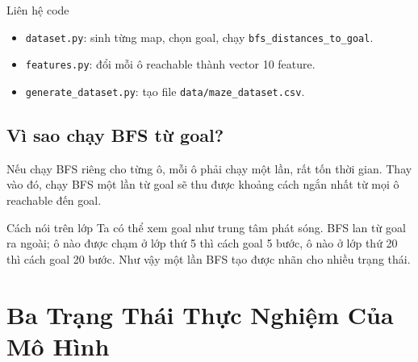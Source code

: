 \documentclass[12pt,a4paper]{article}
\newcommand{\code}[1]{\texttt{#1}}
\begin{document}
\begin{center}
\end{center}

\begin{teachbox}{Liên hệ code}
\begin{itemize}
    \item \code{dataset.py}: sinh từng map, chọn goal, chạy \code{bfs\_distances\_to\_goal}.
    \item \code{features.py}: đổi mỗi ô reachable thành vector 10 feature.
    \item \code{generate\_dataset.py}: tạo file \code{data/maze\_dataset.csv}.
\end{itemize}
\end{teachbox}

\subsection{Vì sao chạy BFS từ goal?}

Nếu chạy BFS riêng cho từng ô, mỗi ô phải chạy một lần, rất tốn thời gian. Thay vào đó, chạy BFS một lần từ goal sẽ thu được khoảng cách ngắn nhất từ mọi ô reachable đến goal.

\begin{saybox}{Cách nói trên lớp}
Ta có thể xem goal như trung tâm phát sóng. BFS lan từ goal ra ngoài; ô nào được chạm ở lớp thứ 5 thì cách goal 5 bước, ô nào ở lớp thứ 20 thì cách goal 20 bước. Như vậy một lần BFS tạo được nhãn cho nhiều trạng thái.
\end{saybox}

\section{Ba Trạng Thái Thực Nghiệm Của Mô Hình}
\end{document}
